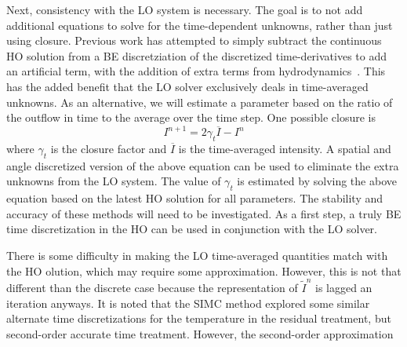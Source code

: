 Next, consistency with the LO system is
necessary.  The goal is to not add additional equations to solve for the
time-dependent unknowns, rather than just using closure.   Previous work has attempted to simply subtract the continuous HO solution
from a BE discretziation of the discretized time-derivatives to add an artificial
term, with the addition of extra terms from hydrodynamics~\cite{holo_rh}.  This has the added benefit that the LO solver exclusively deals in
time-averaged unknowns.  As an alternative, we will estimate a parameter based on the
ratio of the outflow in time to the average over the time step. One possible closure
is
\begin{equation}
    I^{n+1} = 2\gamma_t \overline{I} - I^{n}
\end{equation}
where $\gamma_t$ is the closure factor and $\overline{I}$ is the time-averaged
intensity.  A spatial and angle discretized version of the above equation can be used to
eliminate the extra unknowns from the LO system.  The value of $\gamma_t$ is
estimated by solving the above equation based on the latest HO solution for all
parameters.  The stability and accuracy of these methods will need
to be investigated. As a first step, a truly BE time discretization in the HO can be
used in conjunction with the LO solver.


  There
is some difficulty in making the LO time-averaged quantities match with the HO
olution, which may require some approximation.  However, this is not that different
than the discrete case because the representation of $\tilde I^{n}$ is lagged an
iteration anyways. 
It is noted that the SIMC method explored 
some similar alternate time discretizations for the temperature in the residual
treatment, but second-order accurate time treatment.  However, the second-order approximation
